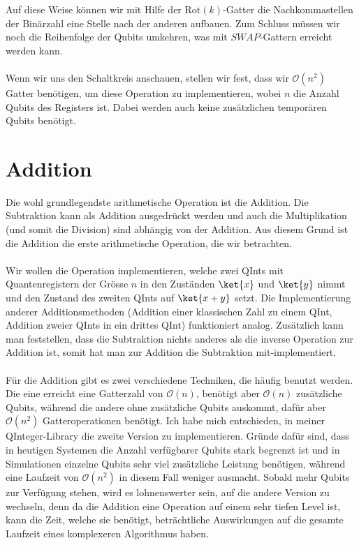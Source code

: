 Auf diese Weise können wir mit Hilfe der $\text{Rot}(k)$-Gatter die Nachkommastellen der Binärzahl eine Stelle nach der anderen aufbauen. Zum Schluss müssen wir noch die Reihenfolge der Qubits umkehren, was mit $SWAP$-Gattern erreicht werden kann.

\paragraph{}
Wenn wir uns den Schaltkreis anschauen, stellen wir fest, dass wir $\mathcal O(n^2)$ Gatter benötigen, um diese Operation zu implementieren, wobei $n$ die Anzahl Qubits des Registers ist. Dabei werden auch keine zusätzlichen temporären Qubits benötigt. 

\section{Addition}
Die wohl grundlegendste arithmetische Operation ist die Addition. Die Subtraktion kann als Addition ausgedrückt werden und auch die Multiplikation (und somit die Division) sind abhängig von der Addition. Aus diesem Grund ist die Addition die erste arithmetische Operation, die wir betrachten. 
\paragraph{}
Wir wollen die Operation implementieren, welche zwei QInts mit Quantenregistern der Grösse $n$ in den Zuständen $\ket{x}$ und $\ket{y}$ nimmt und den Zustand des zweiten QInts auf $\ket{x + y}$ setzt. Die Implementierung anderer Additionsmethoden (Addition einer klassischen Zahl zu einem QInt, Addition zweier QInts in ein drittes QInt) funktioniert analog. Zusätzlich kann man feststellen, dass die Subtraktion nichts anderes als die inverse Operation zur Addition ist, somit hat man zur Addition die Subtraktion mit-implementiert.

\paragraph{}

Für die Addition gibt es zwei verschiedene Techniken, die häufig benutzt werden. Die eine erreicht eine Gatterzahl von $\mathcal O(n)$, benötigt aber $\mathcal O(n)$ zusätzliche Qubits, während die andere ohne zusätzliche Qubits auskommt, dafür aber $\mathcal O(n^2)$ Gatteroperationen benötigt. Ich habe mich entschieden, in meiner QInteger-Library die zweite Version zu implementieren. Gründe dafür sind, dass in heutigen Systemen die Anzahl verfügbarer Qubits stark begrenzt ist und in Simulationen einzelne Qubits sehr viel zusätzliche Leistung benötigen, während eine Laufzeit von $\mathcal O(n^2)$ in diesem Fall weniger ausmacht. Sobald mehr Qubits zur Verfügung stehen, wird es lohnenswerter sein, auf die andere Version zu wechseln, denn da die Addition eine Operation auf einem sehr tiefen Level ist, kann die Zeit, welche sie benötigt, beträchtliche Auswirkungen auf die gesamte Laufzeit eines komplexeren Algorithmus haben.

